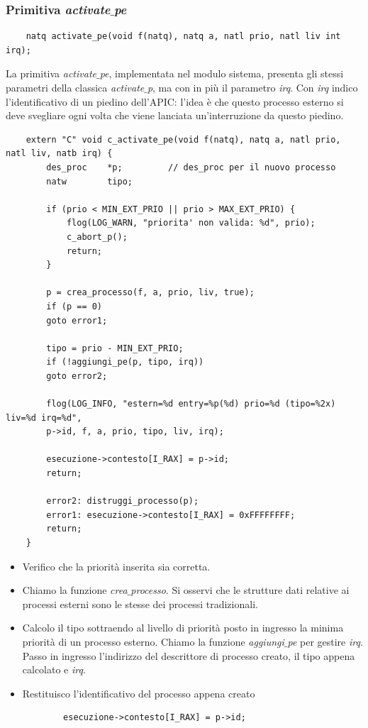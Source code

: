 \subsubsection{Primitiva \emph{activate$\_$pe}}
\begin{verbatim}
	natq activate_pe(void f(natq), natq a, natl prio, natl liv int irq);
\end{verbatim}
La primitiva \emph{activate$\_$pe}, implementata nel modulo sistema, presenta gli stessi parametri della classica \emph{activate$\_$p}, ma con in più il parametro \emph{irq}. Con \emph{irq} indico l'identificativo di un piedino dell'APIC: l'idea è che questo processo esterno si deve svegliare ogni volta che viene lanciata un'interruzione da questo piedino.
\begin{verbatim}
	extern "C" void c_activate_pe(void f(natq), natq a, natl prio, natl liv, natb irq) {
		des_proc	*p;			// des_proc per il nuovo processo
		natw		tipo;
		
		if (prio < MIN_EXT_PRIO || prio > MAX_EXT_PRIO) {
			flog(LOG_WARN, "priorita' non valida: %d", prio);
			c_abort_p();
			return;
		}
		
		p = crea_processo(f, a, prio, liv, true);
		if (p == 0)
		goto error1;
		
		tipo = prio - MIN_EXT_PRIO;
		if (!aggiungi_pe(p, tipo, irq))
		goto error2;
		
		flog(LOG_INFO, "estern=%d entry=%p(%d) prio=%d (tipo=%2x) liv=%d irq=%d", 
		p->id, f, a, prio, tipo, liv, irq);
		
		esecuzione->contesto[I_RAX] = p->id;
		return;
		
		error2:	distruggi_processo(p);
		error1: esecuzione->contesto[I_RAX] = 0xFFFFFFFF;
		return;
	}
\end{verbatim}
\begin{itemize}
	\item Verifico che la priorità inserita sia corretta.
	\item Chiamo la funzione \emph{crea$\_$processo}. Si osservi che le strutture dati relative ai processi esterni sono le stesse dei processi tradizionali.
	\item Calcolo il tipo sottraendo al livello di priorità posto in ingresso la minima priorità di un processo esterno. Chiamo la funzione \emph{aggiungi$\_$pe} per gestire \emph{irq}. Passo in ingresso l'indirizzo del descrittore di processo creato, il tipo appena calcolato e \emph{irq}.
	\item Restituisco l'identificativo del processo appena creato
	\begin{verbatim}
		esecuzione->contesto[I_RAX] = p->id;
	\end{verbatim}
\end{itemize}
